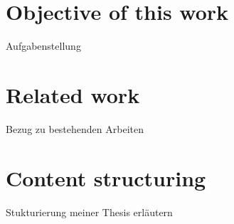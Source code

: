 \section{Objective of this work}
\label{section:obejective}
Aufgabenstellung
\section{Related work}
\label{section:relatedwork}
Bezug zu bestehenden Arbeiten
\section{Content structuring}
\label{section:contentstructuring}
Stukturierung meiner Thesis erläutern

%
%
%
